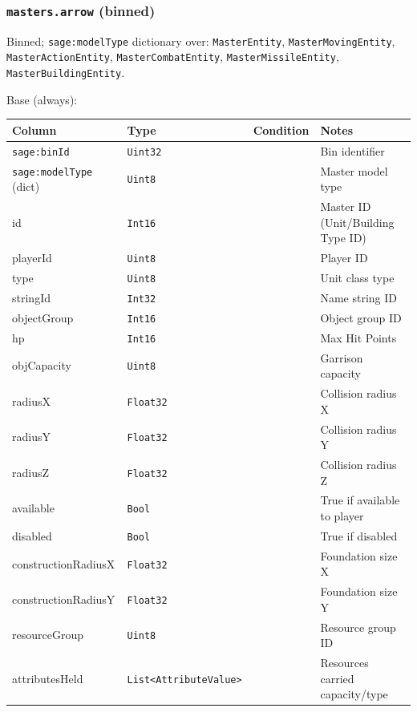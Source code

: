 \subsubsection*{\texttt{masters.arrow} (binned)}

Binned; \texttt{sage:modelType} dictionary over:
\texttt{MasterEntity}, \texttt{MasterMovingEntity}, \texttt{MasterActionEntity}, \texttt{MasterCombatEntity}, \texttt{MasterMissileEntity}, \texttt{MasterBuildingEntity}.

Base (always):

\begin{longtable}{@{}p{}p{}p{}p{}@{}}
  \toprule
  Column & Type & Condition & Notes \\
  \midrule
  \endhead
  \texttt{sage:binId} & \texttt{Uint32} & & Bin identifier \\
  \texttt{sage:modelType} (dict) & \texttt{Uint8} & & Master model type \\
  id & \texttt{Int16} & & Master ID (Unit/Building Type ID) \\
  playerId & \texttt{Uint8} & & Player ID \\
  type & \texttt{Uint8} & & Unit class type \\
  stringId & \texttt{Int32} & & Name string ID \\
  objectGroup & \texttt{Int16} & & Object group ID \\
  hp & \texttt{Int16} & & Max Hit Points \\
  objCapacity & \texttt{Uint8} & & Garrison capacity \\
  radiusX & \texttt{Float32} & & Collision radius X \\
  radiusY & \texttt{Float32} & & Collision radius Y \\
  radiusZ & \texttt{Float32} & & Collision radius Z \\
  available & \texttt{Bool} & & True if available to player \\
  disabled & \texttt{Bool} & & True if disabled \\
  constructionRadiusX & \texttt{Float32} & & Foundation size X \\
  constructionRadiusY & \texttt{Float32} & & Foundation size Y \\
  resourceGroup & \texttt{Uint8} & & Resource group ID \\
  attributesHeld & \texttt{List\-<Attribute}\-\texttt{Value>} & & Resources carried capacity/type \\
  \bottomrule
\end{longtable}

